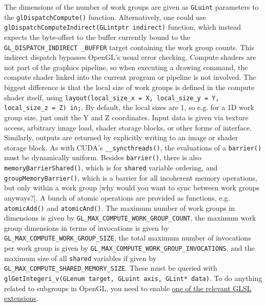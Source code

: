 \documentclass[table, xcdraw]{article}%
\begin{document}
The dimensions of the number of work groups are given as \texttt{GLuint} parameters to the \texttt{glDispatchCompute()} function. Alternatively, one could use \texttt{glDispatchComputeIndirect(GLintptr indirect)} function, which instead expects the byte-offset to the buffer currently bound to the \texttt{GL_DISPATCH_INDIRECT _BUFFER} target containing the work group counts. This indirect dispatch bypasses OpenGL's usual error checking. Compute shaders are not part of the graphics pipeline, so when executing a drawing command, the compute shader linked into the current program or pipeline is not involved. The biggest difference is that the local size of work groups is defined in the compute shader itself, using \texttt{layout(local_size_x = X, local_size_y = Y, local_size_z = Z) in;}. By default, the local sizes are 1, so e.g. for a 1D work group size, just omit the Y and Z coordinates. Input data is given via texture access, arbitrary image load, shader storage blocks, or other forms of interface. Similarly, outputs are returned by explicitly writing to an image or shader storage block. As with CUDA's \texttt{__syncthreads()}, the evaluations of a \texttt{barrier()} must be dynamically uniform. Besides \texttt{barrier()}, there is also \texttt{memoryBarrierShared()}, which is for \texttt{shared} variable ordering, and \texttt{groupMemoryBarrier()}, which is a barrier for all incoherent memory operations, but only within a work group [why would you want to sync between work groups anyways?]. A bunch of atomic operations are provided as functions, e.g. \texttt{atomicAdd()} and \texttt{atomicAnd()}. The maximum number of work groups in dimensions is given by \texttt{GL_MAX_COMPUTE_WORK_GROUP_COUNT}, the maximum work group dimensions in terms of invocations is given by \texttt{GL_MAX_COMPUTE_WORK_GROUP_SIZE}, the total maximum number of invocations per work group is given by \texttt{GL_MAX_COMPUTE_WORK_GROUP_INVOCATIONS}, and the maximum size of all \texttt{shared} variables if given by \texttt{GL_MAX_COMPUTE_SHARED_MEMORY_SIZE}. These must be queried with \texttt{glGetIntegeri_v(GLenum target, GLuint axis, GLint* data)}. To do anything related to subgroups in OpenGL, you need to enable \href{https://github.com/KhronosGroup/GLSL/blob/5757aa6a24a1e92faeae29b0cc1d502c74ca2a78/extensions/khr/GL_KHR_shader_subgroup.txt#L87}{one of the relevant GLSL extensions}.
\end{document}
